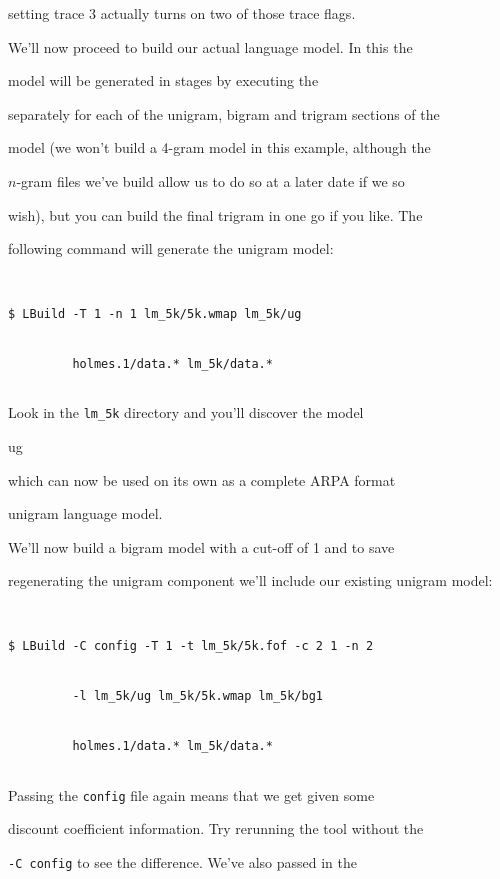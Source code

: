 setting trace 3 actually turns on two of those trace flags.





We'll now proceed to build our actual language model.  In this the


model will be generated in stages by executing the 


separately for each of the unigram, bigram and trigram sections of the


model (we won't build a 4-gram model in this example, although the


$n$-gram files we've build allow us to do so at a later date if we so


wish), but you can build the final trigram in one go if you like.  The


following command will generate the unigram model:


\begin{verbatim}


$ LBuild -T 1 -n 1 lm_5k/5k.wmap lm_5k/ug 


         holmes.1/data.* lm_5k/data.*


\end{verbatim} %


Look in the {\tt lm\_5k} directory and you'll discover the model {\tt


ug} which can now be used on its own as a complete ARPA format


unigram language model.





We'll now build a bigram model with a cut-off of 1 and to save


regenerating the unigram component we'll include our existing unigram model:


\begin{verbatim}


$ LBuild -C config -T 1 -t lm_5k/5k.fof -c 2 1 -n 2


         -l lm_5k/ug lm_5k/5k.wmap lm_5k/bg1 


         holmes.1/data.* lm_5k/data.*


\end{verbatim} %


Passing the {\tt config} file again means that we get given some


discount coefficient information.  Try rerunning the tool without the


{\tt -C config} to see the difference.  We've also passed in the


